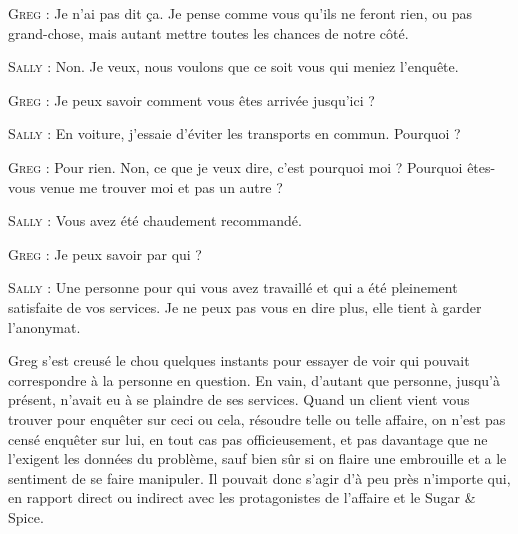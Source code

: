 \begin{dialogue}
\textsc{Greg} : Je n’ai pas dit ça. Je pense comme vous qu’ils ne feront rien, ou pas grand-chose, mais autant mettre toutes les chances de notre côté.

\textsc{Sally} : Non. Je veux, nous voulons que ce soit vous qui meniez l’enquête.

\textsc{Greg} : Je peux savoir comment vous êtes arrivée jusqu’ici ?

\textsc{Sally} : En voiture, j’essaie d’éviter les transports en commun. Pourquoi ?

\textsc{Greg} : Pour rien. Non, ce que je veux dire, c’est pourquoi moi ? Pourquoi êtes-vous venue me trouver moi et pas un autre ?

\textsc{Sally} : Vous avez été chaudement recommandé.

\textsc{Greg} : Je peux savoir par qui ?

\textsc{Sally} : Une personne pour qui vous avez travaillé et qui a été pleinement satisfaite de vos services. Je ne peux pas vous en dire plus, elle tient à garder l’anonymat.

\end{dialogue}

Greg s’est creusé le chou quelques instants pour essayer de voir qui pouvait correspondre à la personne en question. En vain, d’autant que personne, jusqu’à présent, n’avait eu à se plaindre de ses services. Quand un client vient vous trouver pour enquêter sur ceci ou cela, résoudre telle ou telle affaire, on n’est pas censé enquêter sur lui, en tout cas pas officieusement, et pas davantage que ne l’exigent les données du problème, sauf bien sûr si on flaire une embrouille et a le sentiment de se faire manipuler. Il pouvait donc s’agir d’à peu près n’importe qui, en rapport direct ou indirect avec les protagonistes de l’affaire et le Sugar \& Spice.

